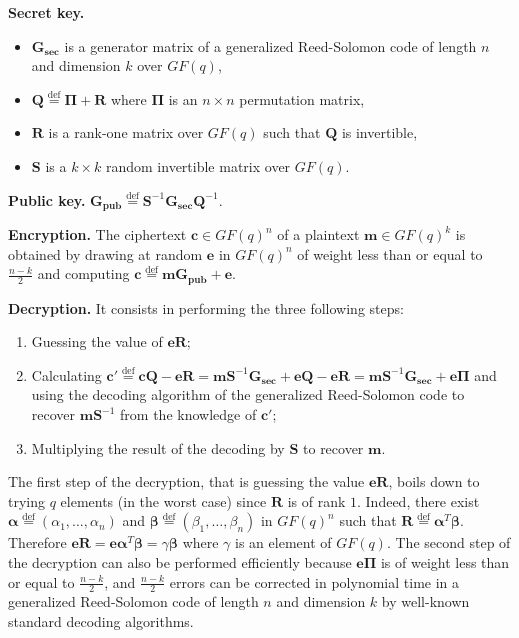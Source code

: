 \documentclass[runningheads,11pt]{llncs}
\newcommand{\eqdef}{\stackrel{\text{def}}{=}}
\newcommand{\word}[1]{\ensuremath{\boldsymbol{#1}}}
\newcommand{\alphav}{\word{\alpha}}
\newcommand{\betav}{\word{\beta}}
\newcommand{\cv}{\word{c}}
\newcommand{\ev}{\word{e}}
\newcommand{\mv}{\word{m}}
\newcommand{\mat}[1]{\ensuremath{\boldsymbol{#1}}}
\newcommand{\Pim}{\mat{\Pi}}
\newcommand{\Qm}{\mat{Q}}
\newcommand{\Rm}{\mat{R}}
\newcommand{\Sm}{\mat{S}}
\newcommand{\Gms}{\mat{G_{sec}}}
\newcommand{\Gmp}{\mat{G_{pub}}}
\newcommand{\fq}{GF(q)}
\begin{document}
\begin{description}
	\item \textbf{Secret key.} 
          \begin{itemize}
          \item $\Gms$ is a generator matrix of a generalized
            Reed-Solomon code of length $n$ and dimension $k$ over $\fq$,  
          \item $ \Qm  \eqdef \Pim + \Rm $ where
            $\Pim$ is an $n \times n$ permutation matrix, 
          \item $\Rm$ is a rank-one matrix over $\fq$ such that $\Qm$
            is invertible, 
          \item $\Sm$ is a $k \times k$ random invertible  matrix over $\fq$.
          \end{itemize}
        \item \textbf{Public key.} $\displaystyle \Gmp \eqdef \Sm^{-1} \Gms \Qm^{-1}$. 
          
	\item \textbf{Encryption.} The ciphertext $\cv \in \fq^n$ of a plaintext
          $\mv \in \fq^k$ is obtained by drawing at random $\ev$
          in $\fq^n$ of weight less than or equal  to $\frac{n-k}{2}$ and computing
          $\displaystyle \cv \eqdef \mv \Gmp  +  \ev$. 
          
	\item \textbf{Decryption.} It consists in performing the three
          following steps:
	\begin{enumerate}
	\item Guessing the value of  $\ev  \Rm$;
	\item Calculating $\cv' \eqdef \cv \Qm - \ev \Rm= \mv \Sm^{-1}\Gms + \ev  \Qm - \ev \Rm =  \mv \Sm^{-1}\Gms + \ev  \Pim $
	and using the decoding algorithm of the generalized Reed-Solomon code to recover
	$\mv \Sm^{-1}$ from the knowledge of $\cv'$;
	\item Multiplying the result of the decoding by $\Sm$ to recover $\mv$.
	\end{enumerate}
\end{description}

The first step of the decryption, that is guessing the value $\ev
\Rm$, boils down to trying $q$ elements (in the worst case) since
$\Rm$ is of rank $1$. Indeed, there exist 
 $\alphav \eqdef (\alpha_1, \dots{}, \alpha_n) $ and $\betav \eqdef (\beta_1, \dots{}, \beta_n)$ in $\fq^n$
 such that  $\Rm \eqdef \alphav^T \betav$. Therefore $\ev \Rm = \ev \alphav^T \betav= \gamma \betav$ where $\gamma$
 is an element of $\fq$. The second step of the decryption can also be
 performed efficiently because $\ev \Pim$ is of weight less than or
 equal to $\frac{n-k}{2}$, and $\frac{n-k}{2}$ errors can be corrected
 in polynomial time in a generalized Reed-Solomon code of length $n$ and dimension $k$  by well-known standard decoding algorithms. 
\end{document}
